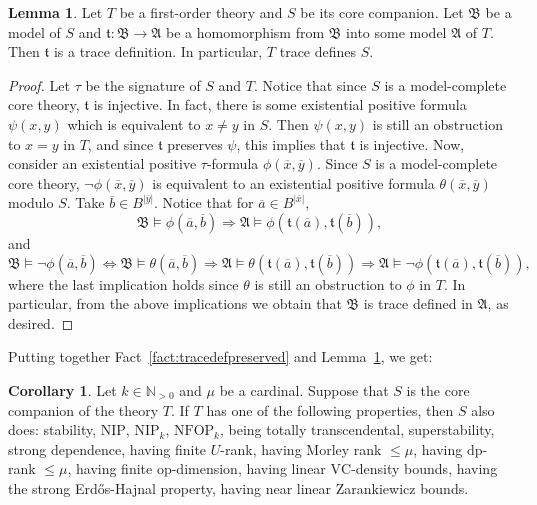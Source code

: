 \documentclass{amsart}
\theoremstyle{definition}
\newtheorem{lemma}[theorem]{Lemma}
\newtheorem{corollary}[theorem]{Corollary}
\theoremstyle{remark}
\numberwithin{equation}{section}
\newcommand{\fa}{\mathfrak{A}}
\newcommand{\fb}{\mathfrak{B}}
\begin{document}
\begin{lemma}\label{lem:tracedef} Let $T$ be a first-order theory and $S$ be its core companion. Let $\fb$ be a model of $S$ and $\mathfrak{t} \colon \fb\to\fa$ be a homomorphism from $\fb$ into some model $\fa$ of $T$. Then $\mathfrak{t}$ is a trace definition.
In particular, $T$ trace defines $S$.
\end{lemma}
\begin{proof} 
{Let $\tau$ be the signature of $S$ and $T$.}
Notice that since $S$ is a model-complete core theory, $\mathfrak{t}$ is injective. In fact, there is some existential positive formula $\psi(x,y)$ which is equivalent to 
$x\neq y$ in $S$. Then $\psi(x,y)$ is still an obstruction to $x=y$ in $T$, and since  $\mathfrak{t}$ preserves $\psi$, this implies that $\mathfrak{t}$ is injective. Now, consider an existential positive $\tau$-formula $\phi(\overline{x}, \overline{y})$. 
{Since $S$ is a model-complete core theory, 
$\neg\phi(\overline{x}, \overline{y})$ is equivalent to an
existential positive formula 
$\theta(\overline{x}, \overline{y})$ modulo $S$.}
Take $\overline{b}\in B^{|\overline{y}|}$. Notice that for $\overline{a}\in B^{|\overline{x}|}$,
\[\fb\vDash \phi(\overline{a}, \overline{b})\Rightarrow \fa\vDash\phi(\mathfrak{t}(\overline{a}), \mathfrak{t}(\overline{b})), \] 
and 
\[\fb\vDash\neg\phi(\overline{a}, \overline{b})\Leftrightarrow \fb\vDash\theta(\overline{a}, \overline{b})\Rightarrow\fa\vDash\theta(\mathfrak{t}(\overline{a}), \mathfrak{t}(\overline{b}))\Rightarrow \fa\vDash\neg\phi(\mathfrak{t}(\overline{a}), \mathfrak{t}(\overline{b})),\]
where the last implication holds since $\theta$ is still an obstruction to $\phi$ in $T$. In particular, from the above implications we obtain that $\fb$ is trace defined in $\fa$, as desired.
\end{proof}

Putting together Fact~\ref{fact:tracedefpreserved} and Lemma~\ref{lem:tracedef}, we get:

\begin{corollary}\label{cor:trace}Let $k\in\mathbb{N}_{>0}$ and $\mu$ be a cardinal. Suppose that $S$ is the core companion of the theory $T$. If $T$ has one of the following properties, then $S$ also does: stability, $\mathrm{NIP}$, $\mathrm{NIP}_k$, $\mathrm{NFOP}_k$, being totally transcendental, superstability, strong dependence, having finite $U$-rank, having Morley rank $\leq \mu$, having $\mathrm{dp}$-rank $\leq \mu$, having finite $\mathrm{op}$-dimension, having linear $\mathrm{VC}$-density bounds, having the strong {Erd\H{o}s}-Hajnal property, having near linear Zarankiewicz bounds. 
\end{corollary}
\end{document}
